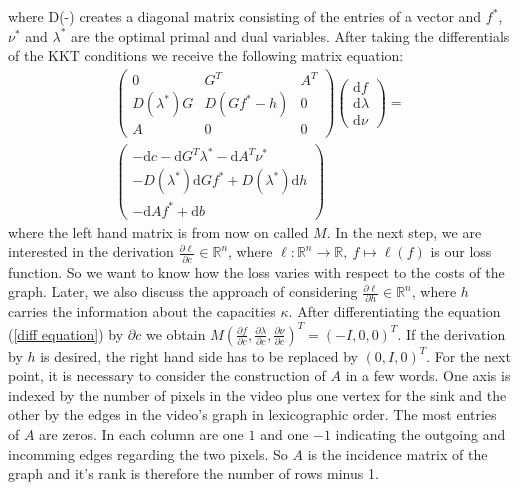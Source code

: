 \documentclass{article}
\begin{document}
{where D(-) creates a diagonal matrix consisting of the entries of a vector and $f^*$, $\nu^*$ and $\lambda^*$ are the optimal primal and dual variables. After taking the differentials of the KKT conditions we receive the following matrix equation:
\begin{align}\label{diff equation} 
\begin{pmatrix} 0 & G^T & A^T \\ D(\lambda^*) G & D(Gf^* -h) & 0 \\ A & 0 & 0 \end{pmatrix}
\begin{pmatrix} \mathrm{d} f \\ \mathrm{d} \lambda \\ \mathrm{d} \nu \end{pmatrix} = \\
\begin{pmatrix} -\mathrm{d}c - \mathrm{d}G^T \lambda^* -\mathrm{d}A^T\nu^* \\ 
-D(\lambda^*)\mathrm d G f^* + D(\lambda^*)\mathrm d h \\
-\mathrm d A f^* + \mathrm d b \end{pmatrix} \nonumber
\end{align}
where the left hand matrix is from now on called $M$.
In the next step, we are interested in the derivation $\frac{\partial \ell}{\partial c}\in \mathbb R ^n$, where $\ell: \mathbb{R}^n \rightarrow \mathbb R,~f\mapsto \ell(f) $ is our loss function. So we want to know how the loss varies with respect to the costs of the graph. Later, we also discuss the approach of considering $\frac{\partial \ell}{\partial h}\in \mathbb R^n$, where $h$ carries the information about the capacities $\kappa$. After differentiating the equation (\ref*{diff equation}) by $\partial c$ we obtain
$M (\frac{\partial f}{\partial c}, \frac{\partial\lambda}{\partial c}, \frac{\partial \nu}{\partial c})^T
= ( -I, 0, 0 )^T.$
If the derivation by $h$ is desired, the right hand side has to be replaced by $(0, I, 0)^T$.
For the next point, it is necessary to consider the construction of $A$ in a few words. One axis is indexed by the number of pixels in the video plus one vertex for the sink and the other by the edges in the video's graph in lexicographic order. The most entries of $A$ are zeros. In each column are one $1$ and one $-1$ indicating the outgoing and incomming edges regarding the two pixels. So $A$ is the incidence matrix of the graph and it's rank is therefore the number of rows minus 1.\\
}
\end{document}
